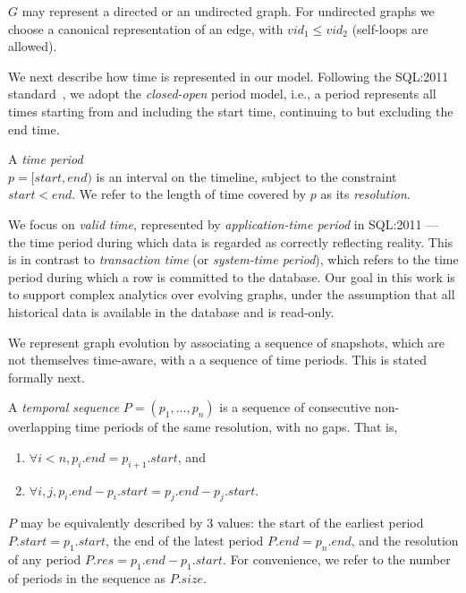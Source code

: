 $G$ may represent a directed or an undirected graph.  For undirected
graphs we choose a canonical representation of an edge, with $vid_1
\leq vid_2$ (self-loops are allowed).

We next describe how time is represented in our model.  Following the
SQL:2011 standard~\cite{DBLP:journals/sigmod/KulkarniM12}, we adopt
the {\em closed-open} period model, i.e., a period represents all
times starting from and including the start time, continuing to but
excluding the end time.

\begin{definition}
\label{def:period} 
A {\em time period} \\$p = [start, end)$ is an interval on the timeline,
  subject to the constraint $start < end$.  We refer to the length of
  time covered by $p$ as its {\em resolution}.
\end{definition}

We focus on {\em valid time}, represented by {\em application-time
  period} in SQL:2011 --- the time period during which data is
regarded as correctly reflecting reality.  This is in contrast to {\em
  transaction time} (or {\em system-time period}), which refers to the
time period during which a row is committed to the database.  Our goal
in this work is to support complex analytics over evolving graphs,
under the assumption that all historical data is available in the
database and is read-only.

We represent graph evolution by associating a sequence of snapshots,
which are not themselves time-aware, with a a sequence of time
periods.  This is stated formally next.

\begin{definition} 
\label{def:tseq} 
A {\em temporal sequence} $P = (p_1, \ldots, p_n)$ is a
sequence of consecutive non-overlapping time periods of the same
resolution, with no gaps.  That is,

\begin{enumerate}
\item $\forall i < n, p_i.end = p_{i+1}.start$, and 
\item $\forall i, j, p_i.end - p_i.start = p_j.end - p_j.start$.
\end{enumerate}
\end{definition}

$P$ may be equivalently described by 3 values: the start of the
earliest period $P.start = p_1.start$, the end of the latest period
$P.end = p_n.end$, and the resolution of any period $P.res = p_1.end -
p_1.start$. For convenience, we refer to the number of periods in the
sequence as $P.size$.  

